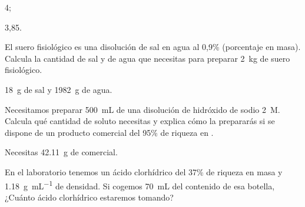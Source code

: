 \documentclass[10pt,a5paper,twoside]{article}
\begin{document}
  \begin{solution}
    \begin{enumerate*}
      \item 4;
      \item 3,85.
    \end{enumerate*}
  \end{solution}



  \begin{exercise}[
      tags    = {termodinámica, entalpía, entalpia de reacción, calor},
      topics  = {química, termoquímica, termodinámica},
      source  = {FQ 1B SAN 2015, p92, e25},
    ]
    El suero fisiológico es una disolución de sal en agua al 0,9\%
    (porcentaje en masa). Calcula la cantidad de sal y de agua
    que necesitas para preparar \SI{2}{\kilo\gram} de suero fisiológico.
  \end{exercise}

  \begin{solution}
    \SI{18}{\gram} de sal y \SI{1982}{\gram} de agua.
  \end{solution}




  \begin{exercise}[
      tags    = {termodinámica, entalpía, entalpia de reacción, calor},
      topics  = {química, termoquímica, termodinámica},
      source  = {FQ 1B SAN 2015, p92, e28},
    ]
    Necesitamos preparar \SI{500}{\milli\liter} de una disolución de hidróxido de sodio \SI{2}{M}. Calcula qué cantidad de soluto necesitas y explica cómo la prepararás si se dispone de un producto comercial del 95\% de riqueza en .
  \end{exercise}

  \begin{solution}
    Necesitas \SI{42.11}{\gram} de  comercial.
  \end{solution}




  \begin{exercise}[
      tags    = {termodinámica, entalpía, entalpia de reacción, calor},
      topics  = {química, termoquímica, termodinámica},
      source  = {FQ 1B SAN 2015, p92, e33},
    ]
    En el laboratorio tenemos un ácido clorhídrico del 37\% de riqueza en masa y \SI{1.18}{\gram\per\milli\liter} de densidad. Si cogemos \SI{70}{\milli\liter} del contenido de esa botella, ¿Cuánto ácido
    clorhídrico estaremos tomando?
  \end{exercise}
\end{document}
